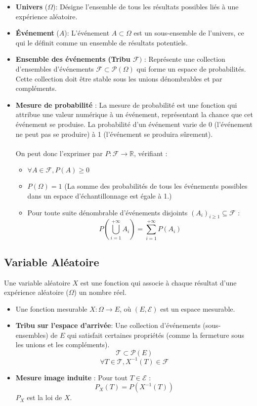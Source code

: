 \documentclass{article}
\begin{document}
\begin{itemize}
    \item \textbf{Univers} ($\Omega$): Désigne l'ensemble de tous les résultats possibles liés à une expérience aléatoire.
    \item \textbf{Événement} ($A$): L'événement $A \subset \Omega $ est un sous-ensemble de l'univers, ce qui le définit comme un ensemble de résultats potentiels.
    \item \textbf{Ensemble des événements (Tribu $\mathcal{F})$} : Représente une collection d'ensembles d'événements $ \mathcal{F} \subset \mathcal{P}(\Omega) $ qui forme un espace de probabilités. Cette collection doit être stable sous les unions dénombrables et par compléments.
    \item \textbf{Mesure de probabilité} : La mesure de probabilité est une fonction qui attribue une valeur numérique à un événement, représentant la chance que cet événement se produise. La probabilité d'un événement varie de 0 (l'événement ne peut pas se produire) à 1 (l'événement se produira sûrement). \\ \\
    On peut donc l'exprimer par $P : \mathcal{F} \rightarrow \mathbb{R}$, vérifiant :
    \begin{itemize}
        \item $ \forall A \in \mathcal{F}, P(A) \geq 0 $
        \item $P(\Omega) = 1$ (La somme des probabilités de tous les événements possibles dans un espace d'échantillonnage est égale à 1.)
        \item Pour toute suite dénombrable d'événements disjoints $(A_i)_{i \geq 1} \subseteq \mathcal{F}$ :
        \[
        P\left( \bigcup_{i=1}^{+\infty} A_i \right) = \sum_{i=1}^{+\infty} P(A_i)
        \]
    \end{itemize}
\end{itemize}

\subsection{Variable Aléatoire}

Une variable aléatoire $ X $ est une fonction qui associe à chaque résultat d'une expérience aléatoire ($\Omega$) un nombre réel.

\begin{itemize}
    \item Une fonction mesurable $X : \Omega \rightarrow E$, où $(E, \mathcal{E})$ est un espace mesurable.
    \item \textbf{Tribu sur l'espace d'arrivée}: Une collection d'événements (sous-ensembles) de $E$ qui satisfait certaines propriétés (comme la fermeture sous les unions et les compléments). 
    \[
    \mathcal{T} \subset \mathcal{P}(E)
    \]
    \[
    \forall T \in \mathcal{T}, X^{-1}(T) \in \mathcal{F}
    \]
    \item \textbf{Mesure image induite} : Pour tout $T \in \mathcal{E}$ :
    \[
    P_X(T) = P(X^{-1}(T))
    \]
    $P_X$ est la loi de $X$.
\end{itemize}
\end{document}
